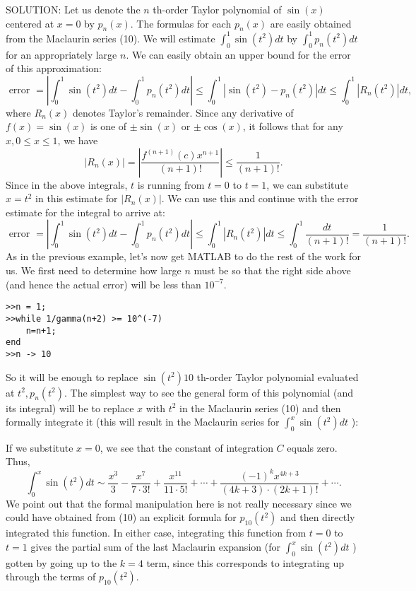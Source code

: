 \documentclass[../main.tex]{subfiles}
\begin{document}
SOLUTION: Let us denote the $n$ th-order Taylor polynomial of $\sin (x)$ centered at $x=0$ by $p_{n}(x)$. The formulas for each $p_{n}(x)$ are easily obtained from the Maclaurin series (10). We will estimate $\int_{0}^{1} \sin \left(t^{2}\right) d t$ by $\int_{0}^{1} p_{n}\left(t^{2}\right) d t$ for an appropriately large $n$. We can easily obtain an upper bound for the error of this approximation:
$$
\text { error }=\left|\int_{0}^{1} \sin \left(t^{2}\right) d t-\int_{0}^{1} p_{n}\left(t^{2}\right) d t\right| \leq \int_{0}^{1}\left|\sin \left(t^{2}\right)-p_{n}\left(t^{2}\right)\right| d t \leq \int_{0}^{1}\left|R_{n}\left(t^{2}\right)\right| d t \text {, }
$$
where $R_{n}(x)$ denotes Taylor's remainder. Since any derivative of $f(x)=\sin (x)$ is one of $\pm \sin (x)$ or $\pm \cos (x)$, it follows that for any $x, 0 \leq x \leq 1$, we have
$$
\left|R_{n}(x)\right|=\left|\frac{f^{(n+1)}(c) x^{n+1}}{(n+1) !}\right| \leq \frac{1}{(n+1) !} .
$$
Since in the above integrals, $t$ is running from $t=0$ to $t=1$, we can substitute $x=t^{2}$ in this estimate for $\left|R_{n}(x)\right|$. We can use this and continue with the error estimate for the integral to arrive at:
$$
\text { error }=\left|\int_{0}^{1} \sin \left(t^{2}\right) d t-\int_{0}^{1} p_{n}\left(t^{2}\right) d t\right| \leq \int_{0}^{1}\left|R_{n}\left(t^{2}\right)\right| d t \leq \int_{0}^{1} \frac{d t}{(n+1) !}=\frac{1}{(n+1) !} .
$$
As in the previous example, let's now get MATLAB to do the rest of the work for us. We first need to determine how large $n$ must be so that the right side above (and hence the actual error) will be less than $10^{-7}$.

\begin{verbatim}
>>n = 1;
>>while 1/gamma(n+2) >= 10^(-7)
	n=n+1;
end
>>n -> 10
\end{verbatim}

So it will be enough to replace $\sin \left(t^{2}\right) 10$ th-order Taylor polynomial evaluated at $t^{2}, p_{n}\left(t^{2}\right)$. The simplest way to see the general form of this polynomial (and its integral) will be to replace $x$ with $t^{2}$ in the Maclaurin series (10) and then formally integrate it (this will result in the Maclaurin series for $\int_{0}^{x} \sin \left(t^{2}\right) d t$ ):

If we substitute $x=0$, we see that the constant of integration $C$ equals zero. Thus,
$$
\int_{0}^{x} \sin \left(t^{2}\right) d t \sim \frac{x^{3}}{3}-\frac{x^{7}}{7 \cdot 3 !}+\frac{x^{11}}{11 \cdot 5 !}+\cdots+\frac{(-1)^{k} x^{4 k+3}}{(4 k+3) \cdot(2 k+1) !}+\cdots .
$$
We point out that the formal manipulation here is not really necessary since we could have obtained from (10) an explicit formula for $p_{10}\left(t^{2}\right)$ and then directly integrated this function. In either case, integrating this function from $t=0$ to $t=1$ gives the partial sum of the last Maclaurin expansion (for $\int_{0}^{x} \sin \left(t^{2}\right) d t$ ) gotten by going up to the $k=4$ term, since this corresponds to integrating up through the terms of $p_{10}\left(t^{2}\right)$.
\end{document}
